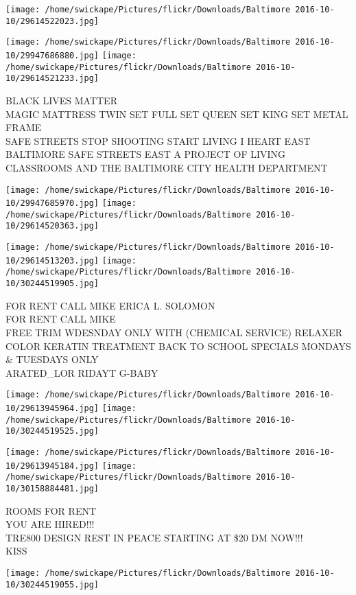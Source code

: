 \documentclass[10pt,letterpaper]{article}
\begin{document}
\texttt{[image: /home/swickape/Pictures/flickr/Downloads/Baltimore 2016-10-10/29614522023.jpg]}

\vspace{0.25in}
\texttt{[image: /home/swickape/Pictures/flickr/Downloads/Baltimore 2016-10-10/29947686880.jpg]}
\texttt{[image: /home/swickape/Pictures/flickr/Downloads/Baltimore 2016-10-10/29614521233.jpg]}

BLACK LIVES MATTER\\
MAGIC MATTRESS TWIN SET FULL SET QUEEN SET KING SET METAL FRAME\\
SAFE STREETS STOP SHOOTING START LIVING I HEART EAST BALTIMORE SAFE STREETS EAST A PROJECT OF LIVING CLASSROOMS AND THE BALTIMORE CITY HEALTH DEPARTMENT
\pagebreak

\texttt{[image: /home/swickape/Pictures/flickr/Downloads/Baltimore 2016-10-10/29947685970.jpg]}
\texttt{[image: /home/swickape/Pictures/flickr/Downloads/Baltimore 2016-10-10/29614520363.jpg]}

\texttt{[image: /home/swickape/Pictures/flickr/Downloads/Baltimore 2016-10-10/29614513203.jpg]}
\texttt{[image: /home/swickape/Pictures/flickr/Downloads/Baltimore 2016-10-10/30244519905.jpg]}

FOR RENT CALL MIKE ERICA L. SOLOMON\\
FOR RENT CALL MIKE\\
FREE TRIM WDESNDAY ONLY WITH (CHEMICAL SERVICE) RELAXER COLOR KERATIN TREATMENT BACK TO SCHOOL SPECIALS MONDAYS \& TUESDAYS ONLY\\
ARATED\_LOR RIDAYT G{-}BABY
\pagebreak

\texttt{[image: /home/swickape/Pictures/flickr/Downloads/Baltimore 2016-10-10/29613945964.jpg]}
\texttt{[image: /home/swickape/Pictures/flickr/Downloads/Baltimore 2016-10-10/30244519525.jpg]}

\texttt{[image: /home/swickape/Pictures/flickr/Downloads/Baltimore 2016-10-10/29613945184.jpg]}
\texttt{[image: /home/swickape/Pictures/flickr/Downloads/Baltimore 2016-10-10/30158884481.jpg]}

ROOMS FOR RENT\\
YOU ARE HIRED!!!\\
TRE800 DESIGN REST IN PEACE STARTING AT \$20 DM NOW!!!\\
KISS
\pagebreak

\texttt{[image: /home/swickape/Pictures/flickr/Downloads/Baltimore 2016-10-10/30244519055.jpg]}
\end{document}
